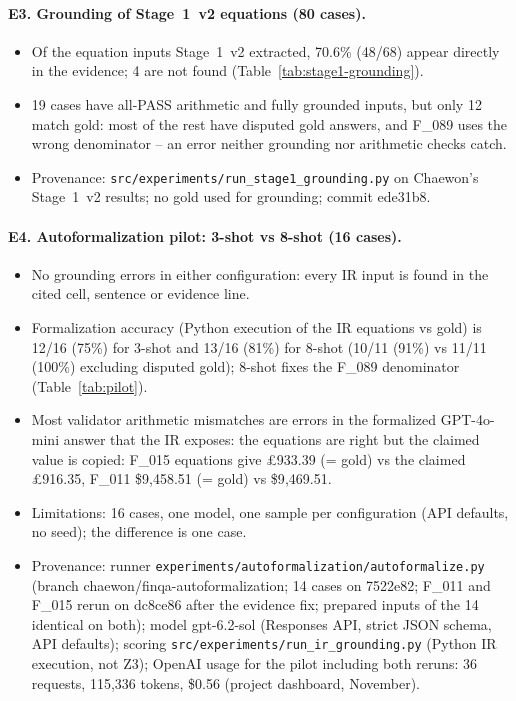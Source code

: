 \paragraph{E3. Grounding of Stage~1~v2 equations (80 cases).}
\begin{itemize}
\item Of the equation inputs Stage~1~v2 extracted, 70.6\% (48/68) appear directly in the evidence; 4 are not found
  (Table~\ref{tab:stage1-grounding}).
\item 19 cases have all-PASS arithmetic and fully grounded inputs, but only 12 match gold: most of the rest
  have disputed gold answers, and F\_089 uses the wrong denominator -- an error neither grounding nor arithmetic checks catch.
\item Provenance: \texttt{src/experiments/run\_stage1\_grounding.py} on Chaewon's Stage~1~v2 results; no gold used for grounding; commit ede31b8.
\end{itemize}

\paragraph{E4. Autoformalization pilot: 3-shot vs 8-shot (16 cases).}
\begin{itemize}
\item No grounding errors in either configuration: every IR input is found in the cited cell, sentence or evidence line.
\item Formalization accuracy (Python execution of the IR equations vs gold) is 12/16 (75\%) for 3-shot and
  13/16 (81\%) for 8-shot (10/11 (91\%) vs
  11/11 (100\%) excluding disputed gold); 8-shot fixes the F\_089 denominator (Table~\ref{tab:pilot}).
\item Most validator arithmetic mismatches are errors in the formalized GPT-4o-mini answer that the IR exposes: the
  equations are right but the claimed value is copied: F\_015 equations give \pounds 933.39 (= gold) vs the claimed \pounds 916.35,
  F\_011 \$9{,}458.51 (= gold) vs \$9{,}469.51.
\item Limitations: 16 cases, one model, one sample per configuration (API defaults, no seed); the difference is one case.
\item Provenance: runner \texttt{experiments/autoformalization/autoformalize.py} (branch chaewon/finqa-autoformalization;
  14 cases on 7522e82; F\_011 and F\_015 rerun on dc8ce86 after the evidence fix; prepared inputs of the 14 identical on both);
  model gpt-6.2-sol (Responses API, strict JSON schema, API defaults); scoring \texttt{src/experiments/run\_ir\_grounding.py}
  (Python IR execution, not Z3); OpenAI usage for the pilot including both reruns: 36 requests, 115,336 tokens, \$0.56 (project dashboard, November).
\end{itemize}
\par\endgroup
